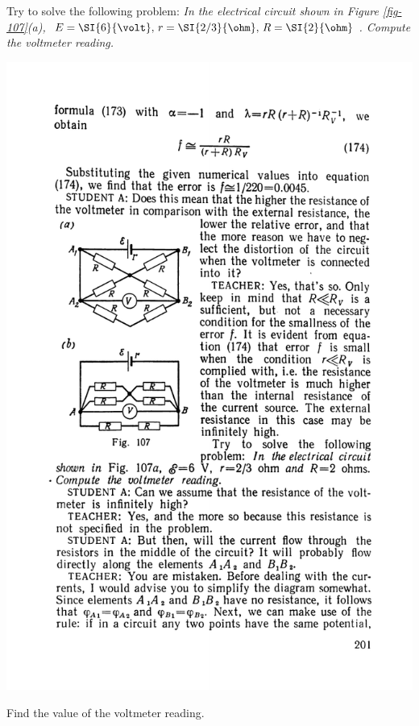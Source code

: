 \documentclass[a4paper,sfsidenotes]{tufte-book}
\begin{document}
Try to solve the following problem:
 \emph{In the electrical circuit shown in \emph{Figure \ref{fig-107}(a)}, $E= \SI{6}{\volt}, \, r =\SI{2/3}{\ohm}, \, R = \SI{2}{\ohm}$. Compute the voltmeter reading. } 

\begin{marginfigure}%
\centering
\includegraphics[width=\linewidth]{fig-107a}
\caption{Find the value of the voltmeter reading.}
\label{fig-107}
\end{marginfigure}
\end{document}
